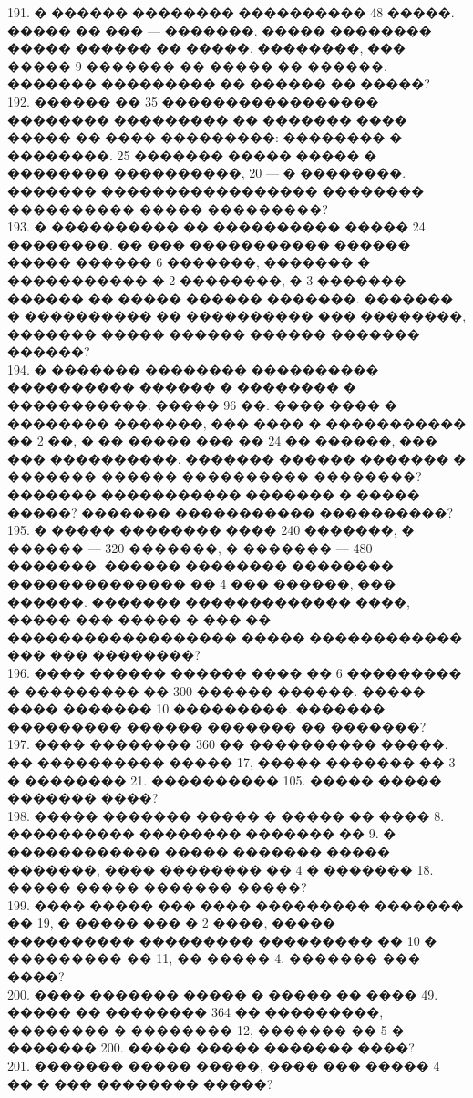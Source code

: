 \documentclass[12pt]{article}
\begin{document}
191. � ������ �������� ���������� 48 �����. ����� �� ��� --- �������. ����� �������� ����� ������ �� �����. ��������, ��� ����� 9 ������� �� ����� �� ������. ������� ��������� �� ������ �� �����?\\
192. ������ �� 35 ����������������� �������� ��������� �� ������� ���� ����� �� ���� ���������: �������� � ��������. 25 ������� ����� ����� � �������� ����������, 20 --- � ��������. ������� ����������������� �������� ���������� ����� ���������?\\
193.  � ���������� �� ���������� ����� 24 ��������. �� ��� ����������� ������ ����� ������ 6 �������, ������� � ����������� � 2 ��������, � 3 ������� ������ �� ����� ������ �������. ������� � ���������� �� ���������� ��� ��������, ������� ����� ������ ������ ������� ������?\\
194. � ������� �������� ���������� ���������� ������ � �������� � �����������. ����� 96 ��.  ���� ���� � �������� �������, ��� ���� � ����������� �� 2 ��, � �� ����� ��� �� 24 �� ������, ��� ��� ����������. ������� ������ ������� � �������  ������ ���������� ��������? ������� ����������� ������� � ����� �����? ������� ����������� ����������?\\
195. � ����� �������� ���� 240 �������, � ������ --- 320 �������, � ������� --- 480 �������. ������ �������� �������� �������������� �� 4 ��� ������, ��� ������. ������� ������������� ����, ����� ��� ����� � ��� �� ������������������ ����� ������������ ��� ��� ��������?\\
196. ���� ������ ������ ���� �� 6 ��������� � ��������� �� 300 ������ ������. ����� ���� ������� 10 ���������. ������� ��������� ������ ������� �� �������?\\
197. ���� �������� 360 �� ���������� �����. �� ���������� ����� 17, ����� ������� �� 3 � �������� 21. ���������� 105. ����� ����� ������� ����?\\
198. ����� ������� ����� � ����� �� ���� 8. ���������� �������� ������� �� 9. � ������������ ����� ������� ����� �������, ���� �������� �� 4 � ������� 18. ����� ����� ������� �����?\\
199.  ���� ����� ��� ���� ��������� ������� �� 19, � ����� ��� � 2 ����, ����� ���������� ��������� ��������� �� 10 � ��������� �� 11, �� ����� 4. ������� ��� ����?\\
200. ���� ������� ����� � ����� �� ���� 49. ����� �� �������� 364 �� ���������, �������� � �������� 12, ������� �� 5 � ������� 200. ����� ����� ������� ����?\\
201. ������� ����� �����, ���� ��� ����� 4 �� � ��� �������� �����?\\
\end{document}
